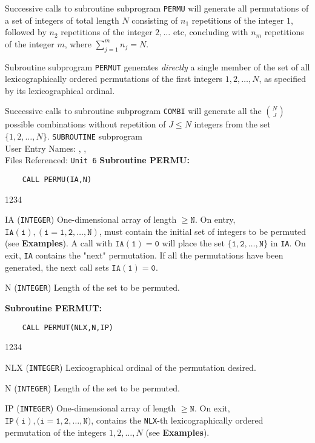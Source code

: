                                
               
                     
                      
Successive calls to
subroutine subprogram {\tt PERMU} will generate all permutations of a
set of integers of total length $N$ consisting of $n_1$ repetitions of
the integer $1$, followed by $n_2$ repetitions of the integer $2,\ldots$
etc, concluding with $n_m$ repetitions of the integer $m$, where
$\sum_{j=1}^m n_j = N$.
\par
Subroutine subprogram {\tt PERMUT} generates {\it directly} a single
member of the set of all lexicographically ordered permutations of the
first integers $1,2,\ldots,N$, as specified by its
lexicographical ordinal.
\par
Successive calls to subroutine subprogram {\tt COMBI} will generate all
the $\binom{N}{J}$ possible combinations without repetition of
$J \leq N$ integers from the set $\{1,2,\ldots,N\}$.
\Structure
{\tt SUBROUTINE} subprogram \\
User Entry Names: , ,  \\
Files Referenced: {\tt Unit 6}
\Usage
{\bf Subroutine PERMU:}
\begin{verbatim}
    CALL PERMU(IA,N)
\end{verbatim}
\begin{DLtt}{1234}
\item[IA] ({\tt INTEGER}) One-dimensional array of length
$\geq \mathtt{N}$.
On entry, $\mathtt{IA(i),(i=1,2,\ldots,N)}$, must contain the
initial set of integers to be permuted (see {\bf Examples}). A call with
$\mathtt{IA(1)=0}$ will place the set $\{\mathtt{1,2,\ldots,N}\}$ in
{\tt IA}. On exit, {\tt IA} contains the "next" permutation. If all the
permutations have been generated, the next call sets $\mathtt{IA(1)=0}$.
\item[N] ({\tt INTEGER}) Length of the set to be permuted.
\end{DLtt}
{\bf Subroutine PERMUT:}
\begin{verbatim}
    CALL PERMUT(NLX,N,IP)
\end{verbatim}
\begin{DLtt}{1234}
\item[NLX] ({\tt INTEGER}) Lexicographical ordinal of the permutation
desired.
\item[N] ({\tt INTEGER}) Length of the set to be permuted.
\item[IP] ({\tt INTEGER}) One-dimensional array of length
$\geq \mathtt{N}$.
On exit, $\mathtt{IP(i),(i=1,2,\ldots,N})$, contains the {\tt NLX}-th
lexicographically ordered permutation of the integers $1,2,\ldots,N$
(see {\bf Examples}).
\end{DLtt}
